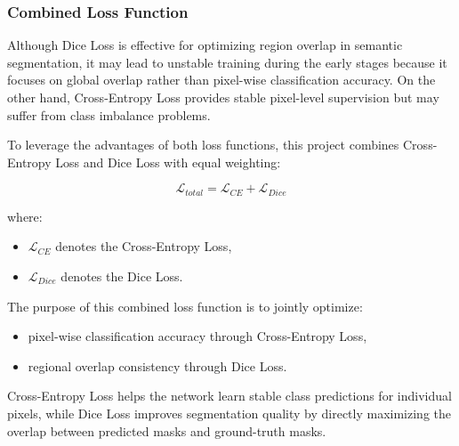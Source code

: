 \subsubsection{Combined Loss Function}

Although Dice Loss is effective for optimizing region overlap in semantic segmentation, it may lead to unstable training during the early stages because it focuses on global overlap rather than pixel-wise classification accuracy. On the other hand, Cross-Entropy Loss provides stable pixel-level supervision but may suffer from class imbalance problems.

To leverage the advantages of both loss functions, this project combines Cross-Entropy Loss and Dice Loss with equal weighting:

\[
\mathcal{L}_{total}
=
\mathcal{L}_{CE}
+
\mathcal{L}_{Dice}
\]

where:
\begin{itemize}
    \item \(\mathcal{L}_{CE}\) denotes the Cross-Entropy Loss,
    \item \(\mathcal{L}_{Dice}\) denotes the Dice Loss.
\end{itemize}

The purpose of this combined loss function is to jointly optimize:
\begin{itemize}
    \item pixel-wise classification accuracy through Cross-Entropy Loss,
    \item regional overlap consistency through Dice Loss.
\end{itemize}

Cross-Entropy Loss helps the network learn stable class predictions for individual pixels, while Dice Loss improves segmentation quality by directly maximizing the overlap between predicted masks and ground-truth masks.

